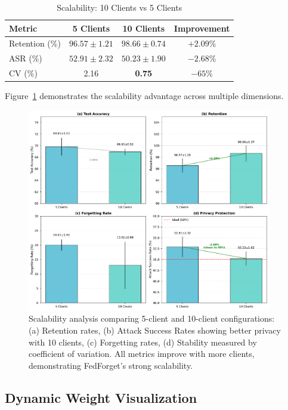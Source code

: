 \documentclass[11pt,a4paper]{article}
\begin{document}
\begin{table}[htbp]
\centering
\caption{Scalability: 10 Clients vs 5 Clients}
\label{tab:scalability}
\begin{tabular}{lccc}
\toprule
Metric & 5 Clients & 10 Clients & Improvement \\
\midrule
Retention (\%) & $96.57 \pm 1.21$ & $\mathbf{98.66 \pm 0.74}$ & $+2.09$\% \\
ASR (\%) & $52.91 \pm 2.32$ & $\mathbf{50.23 \pm 1.90}$ & $-2.68$\% \\
CV (\%) & 2.16 & \textbf{0.75} & $-65$\% \\
\bottomrule
\end{tabular}
\end{table}

Figure~\ref{fig:scalability} demonstrates the scalability advantage across multiple dimensions.

\begin{figure}[htbp]
\centering
\includegraphics[width=0.95\textwidth]{figures/figure3_scalability.pdf}
\caption{Scalability analysis comparing 5-client and 10-client configurations: (a) Retention rates, (b) Attack Success Rates showing better privacy with 10 clients, (c) Forgetting rates, (d) Stability measured by coefficient of variation. All metrics improve with more clients, demonstrating FedForget's strong scalability.}
\label{fig:scalability}
\end{figure}

\subsection{Dynamic Weight Visualization}
\end{document}

